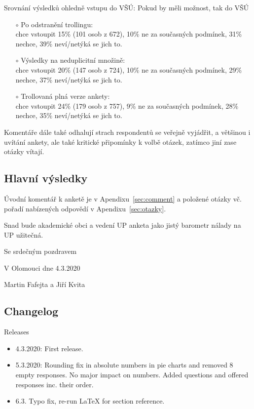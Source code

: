 \documentclass[a4paper,twoside]{article}
\begin{document}
\begin{itemize}
{\bf 
  \item Srovnání výsledků ohledně vstupu do VŠÚ: Pokud by měli možnost, tak do VŠÚ
    \begin{itemize}
       \item[$\circ$] Po odstranění trollingu:
       \\  chce vstoupit 15\% (101 osob z 672), 10\% ne za současných podmínek, 31\% nechce, 39\% neví/netýká se jich to.
       \item[$\circ$] Výsledky na neduplicitní množině:
       \\  chce vstoupit 20\% (147 osob z 724), 10\% ne za současných podmínek, 29\% nechce, 37\% neví/netýká se jich to.
       \item[$\circ$] Trollovaná plná verze ankety:
         \\ chce vstoupit 24\% (179 osob z 757), 9\% ne za současných podmínek, 28\% nechce, 35\% neví/netýká se jich to.
    \end{itemize}
}
  \item Komentáře dále také odhalují strach respondentů se veřejně vyjádřit, a většinou i uvítání ankety, ale také kritické připomínky k volbě otázek, zatímco jiní zase otázky vítají.
\end{itemize}

\subsection{Hlavní výsledky}

Úvodní komentář k anketě je v Apendixu~\ref{sec:comment} a položené otázky vč. pořadí nabízených odpovědí v Apendixu~\ref{sec:otazky}.

\bigskip
{}

\bigskip

\noindent Snad bude akademické obci a vedení UP anketa jako jistý barometr nálady na UP užitečná.

\bigskip

Se srdečným pozdravem

V Olomouci dne 4.3.2020

Martin Fafejta a Jiří Kvita

\subsection{Changelog}
Releases
\begin{itemize}
  \item 4.3.2020: First release.
  \item 5.3.2020: Rounding fix in absolute numbers in pie charts and removed 8 empty responses. No major impact on numbers. Added questions and offered responses inc. their order.
    \item 6.3. Typo fix, re-run \LaTeX{} for section reference.
\end{itemize}
\end{document}
